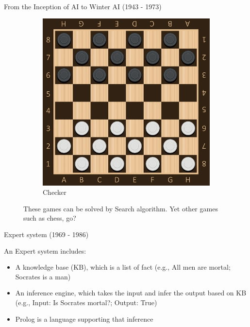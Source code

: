 \begin{frame}{From the Inception of AI to Winter AI (1943 - 1973)}
\begin{figure}
\begin{subfigure}[b]{0.25\textwidth}
            \includegraphics[width=\textwidth]{img/checker.png}
            \caption{Checker}
        \end{subfigure}
        \caption{These games can be solved by Search algorithm. Yet other games such as chess, go?}
    \end{figure}
\end{frame}

\begin{frame}{Expert system (1969 - 1986)}

    An Expert system includes:
    \begin{itemize}
        \item A knowledge base (KB), which is a list of fact (e.g., All men are mortal; Socrates is a man)
        \item An inference engine, which takes the input and infer the output based on KB (e.g., Input: Is Socrates mortal?; Output: True)
        \item Prolog is a language supporting that inference
    \end{itemize}
\end{frame}

